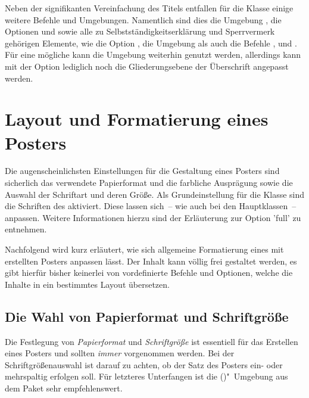 \begin{DeclareEntity}{}
Neben der signifikanten Vereinfachung des Titels entfallen für die Klasse 
 einige weitere Befehle und Umgebungen. Namentlich sind 
dies die Umgebung , die Optionen  
und  sowie alle zu Selbstständigkeitserklärung und 
Sperrvermerk gehörigen Elemente, wie die Option , die 
Umgebung  als auch die Befehle , 
 und . Für eine mögliche \abstractname{} 
kann die Umgebung  weiterhin genutzt werden, allerdings 
kann mit der Option  lediglich noch die Gliederungsebene der 
Überschrift angepasst werden.



\section{Layout und Formatierung eines Posters}

Die augenscheinlichsten Einstellungen für die Gestaltung eines Posters sind 
sicherlich das verwendete Papierformat und die farbliche Ausprägung sowie die 
Auswahl der Schriftart und deren Größe. Als Grundeinstellung für die Klasse
 sind die Schriften des \TUDCDs aktiviert. Diese lassen 
sich~-- wie auch bei den Hauptklassen~-- anpassen. Weitere Informationen hierzu 
sind der Erläuterung zur Option 'full' zu entnehmen.

Nachfolgend wird kurz erläutert, wie sich allgemeine Formatierung eines mit 
 erstellten Posters anpassen lässt. Der Inhalt kann völlig 
frei gestaltet werden, es gibt hierfür bisher keinerlei von \TUDScript 
vordefinierte Befehle und Optionen, welche die Inhalte in ein bestimmtes Layout 
übersetzen.



\subsection{%
  Die Wahl von Papierformat und Schriftgröße%
  \label{sec:fontsize}%
}

Die Festlegung von \emph{Papierformat} und \emph{Schriftgröße} ist essentiell 
für das Erstellen eines Posters und sollten \emph{immer} vorgenommen werden. 
Bei der Schriftgrößenauswahl ist darauf zu achten, ob der Satz des Posters 
ein- oder mehrspaltig erfolgen soll. Für letzteres Unterfangen ist die 
()"~Umgebung aus dem Paket 
 sehr empfehlenswert. 


\end{DeclareEntity}
